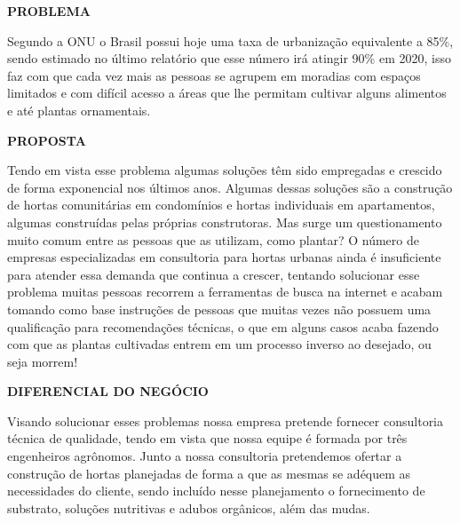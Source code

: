 \textbf{PROBLEMA}

Segundo a ONU o Brasil possui hoje uma taxa de urbanização equivalente a 85\%, sendo estimado no último relatório que esse número irá atingir 90\% em 2020, isso faz com que cada vez mais as pessoas se agrupem em moradias com espaços limitados e com difícil acesso a áreas que lhe permitam cultivar alguns alimentos e até plantas ornamentais.

\textbf{PROPOSTA}

Tendo em vista esse problema algumas soluções têm sido empregadas e crescido de forma exponencial nos últimos anos. Algumas dessas soluções são a construção de hortas comunitárias em condomínios e hortas individuais em apartamentos, algumas construídas pelas próprias construtoras. Mas surge um questionamento muito comum entre as pessoas que as utilizam, como plantar?
O número de empresas especializadas em consultoria para hortas urbanas ainda é insuficiente para atender essa demanda que continua a crescer, tentando solucionar esse problema muitas pessoas recorrem a ferramentas de busca na internet e acabam tomando como base instruções de pessoas que muitas vezes não possuem uma qualificação para recomendações técnicas, o que em alguns casos acaba fazendo com que as plantas cultivadas entrem em um processo inverso ao desejado, ou seja morrem!

\textbf{DIFERENCIAL DO NEGÓCIO}

Visando solucionar esses problemas nossa empresa pretende fornecer consultoria técnica de qualidade, tendo em vista que nossa equipe é formada por três engenheiros agrônomos. Junto a nossa
consultoria pretendemos ofertar a construção de hortas planejadas de forma a que as mesmas se adéquem as necessidades do cliente, sendo incluído nesse planejamento o fornecimento de substrato, soluções nutritivas e adubos orgânicos, além das mudas.


